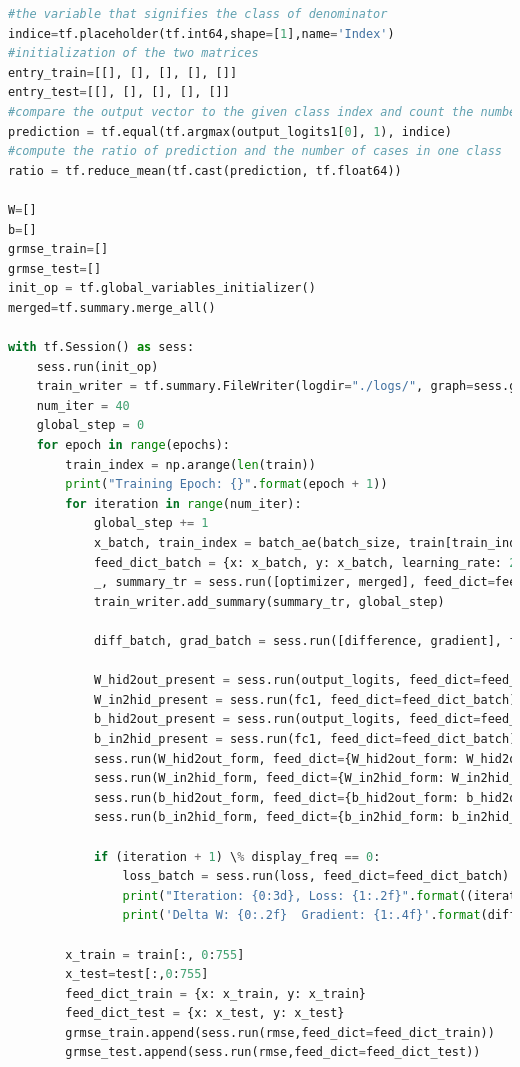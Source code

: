 \documentclass{article}
\begin{document}
\begin{lstlisting}[language=Python]
#the variable that signifies the class of denominator
indice=tf.placeholder(tf.int64,shape=[1],name='Index')
#initialization of the two matrices
entry_train=[[], [], [], [], []]
entry_test=[[], [], [], [], []]
#compare the output vector to the given class index and count the numbers in order to compute the numerator
prediction = tf.equal(tf.argmax(output_logits1[0], 1), indice)
#compute the ratio of prediction and the number of cases in one class
ratio = tf.reduce_mean(tf.cast(prediction, tf.float64))

W=[]
b=[]
grmse_train=[]
grmse_test=[]
init_op = tf.global_variables_initializer()
merged=tf.summary.merge_all()

with tf.Session() as sess:
    sess.run(init_op)
    train_writer = tf.summary.FileWriter(logdir="./logs/", graph=sess.graph)
    num_iter = 40
    global_step = 0
    for epoch in range(epochs):
        train_index = np.arange(len(train))
        print("Training Epoch: {}".format(epoch + 1))
        for iteration in range(num_iter):
            global_step += 1
            x_batch, train_index = batch_ae(batch_size, train[train_index, :])
            feed_dict_batch = {x: x_batch, y: x_batch, learning_rate: 2/(epoch+1)}
            _, summary_tr = sess.run([optimizer, merged], feed_dict=feed_dict_batch)
            train_writer.add_summary(summary_tr, global_step)

            diff_batch, grad_batch = sess.run([difference, gradient], feed_dict=feed_dict_batch)

            W_hid2out_present = sess.run(output_logits, feed_dict=feed_dict_batch)[1]
            W_in2hid_present = sess.run(fc1, feed_dict=feed_dict_batch)[1]
            b_hid2out_present = sess.run(output_logits, feed_dict=feed_dict_batch)[2]
            b_in2hid_present = sess.run(fc1, feed_dict=feed_dict_batch)[2]
            sess.run(W_hid2out_form, feed_dict={W_hid2out_form: W_hid2out_present})
            sess.run(W_in2hid_form, feed_dict={W_in2hid_form: W_in2hid_present})
            sess.run(b_hid2out_form, feed_dict={b_hid2out_form: b_hid2out_present})
            sess.run(b_in2hid_form, feed_dict={b_in2hid_form: b_in2hid_present})

            if (iteration + 1) \% display_freq == 0:
                loss_batch = sess.run(loss, feed_dict=feed_dict_batch)
                print("Iteration: {0:3d}, Loss: {1:.2f}".format((iteration + 1), loss_batch))
                print('Delta W: {0:.2f}  Gradient: {1:.4f}'.format(diff_batch, grad_batch))

        x_train = train[:, 0:755]
        x_test=test[:,0:755]
        feed_dict_train = {x: x_train, y: x_train}
        feed_dict_test = {x: x_test, y: x_test}
        grmse_train.append(sess.run(rmse,feed_dict=feed_dict_train))
        grmse_test.append(sess.run(rmse,feed_dict=feed_dict_test))


\end{lstlisting}
\end{document}
